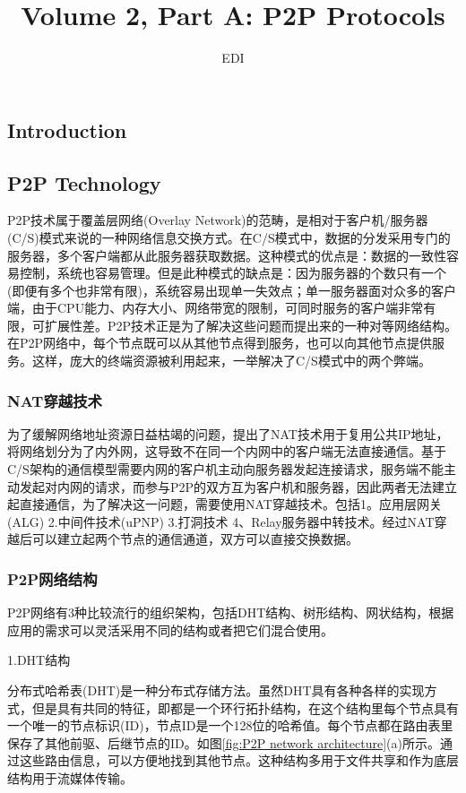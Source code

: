 \documentclass[a4paper,twoside]{scrbook}
\begin{document}
\begin{CJK}{UTF8}{gbsn}
\title{Volume 2, Part A: P2P Protocols}
\author{EDI}

\frontmatter
\maketitle
\tableofcontents
\mainmatter

\chapter{Introduction}
\section{P2P Technology}
P2P技术属于覆盖层网络(Overlay Network)的范畴，是相对于客户机/服务器(C/S)模式来说的一种网络信息交换方式。在C/S模式中，数据的分发采用专门的服务器，多个客户端都从此服务器获取数据。这种模式的优点是：数据的一致性容易控制，系统也容易管理。但是此种模式的缺点是：因为服务器的个数只有一个(即便有多个也非常有限)，系统容易出现单一失效点；单一服务器面对众多的客户端，由于CPU能力、内存大小、网络带宽的限制，可同时服务的客户端非常有限，可扩展性差。P2P技术正是为了解决这些问题而提出来的一种对等网络结构。在P2P网络中，每个节点既可以从其他节点得到服务，也可以向其他节点提供服务。这样，庞大的终端资源被利用起来，一举解决了C/S模式中的两个弊端。
\subsection{NAT穿越技术}
为了缓解网络地址资源日益枯竭的问题，提出了NAT技术用于复用公共IP地址，将网络划分为了内外网，这导致不在同一个内网中的客户端无法直接通信。基于C/S架构的通信模型需要内网的客户机主动向服务器发起连接请求，服务端不能主动发起对内网的请求，而参与P2P的双方互为客户机和服务器，因此两者无法建立起直接通信，为了解决这一问题，需要使用NAT穿越技术。包括1。应用层网关(ALG) 2.中间件技术(uPNP) 3.打洞技术 4、Relay服务器中转技术。经过NAT穿越后可以建立起两个节点的通信通道，双方可以直接交换数据。
\subsection{P2P网络结构}
P2P网络有3种比较流行的组织架构，包括DHT结构、树形结构、网状结构，根据应用的需求可以灵活采用不同的结构或者把它们混合使用。

1.DHT结构

分布式哈希表(DHT)是一种分布式存储方法。虽然DHT具有各种各样的实现方式，但是具有共同的特征，即都是一个环行拓扑结构，在这个结构里每个节点具有一个唯一的节点标识(ID)，节点ID是一个128位的哈希值。每个节点都在路由表里保存了其他前驱、后继节点的ID。如图\ref{fig:P2P network architecture}(a)所示。通过这些路由信息，可以方便地找到其他节点。这种结构多用于文件共享和作为底层结构用于流媒体传输。


\end{CJK}
\end{document}
